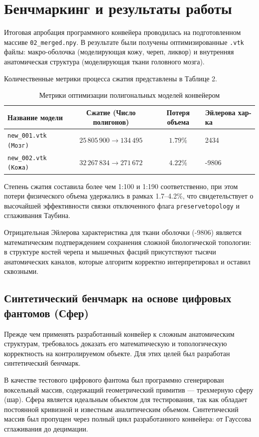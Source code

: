 \documentclass[a4paper,14pt]{article}
\begin{document}
\section{Бенчмаркинг и результаты работы}

Итоговая апробация программного конвейера проводилась на подготовленном массиве \texttt{02\_merged.npy}. В результате были получены оптимизированные \texttt{.vtk} файлы: макро-оболочка (моделирующая кожу, череп, ликвор) и внутренняя анатомическая структура (моделирующая ткани головного мозга).

Количественные метрики процесса сжатия представлены в Таблице 2.
\begin{table}[h]
\centering
\caption{Метрики оптимизации полигональных моделей конвейером}
\begin{tabular}{|l|c|c|l|}
\hline
\textbf{Название модели} & \textbf{Сжатие (Число полигонов)} & \textbf{Потеря объема} & \textbf{Эйлерова хар-ка} \\ \hline
\texttt{new\_001.vtk (Мозг)} & $25\,805\,900 \to 134\,495$ & $1.79\%$ & 2434 \\ \hline
\texttt{new\_002.vtk (Кожа)} & $32\,267\,834 \to 271\,672$ & $4.22\%$ & -9806 \\ \hline
\end{tabular}
\end{table}

Степень сжатия составила более чем 1:100 и 1:190 соответственно, при этом потери физического объема удержались в рамках 1.7--4.2\%, что свидетельствует о высочайшей эффективности связки отключенного флага \texttt{preservetopology} и сглаживания Таубина.

Отрицательная Эйлерова характеристика для ткани оболочки (-9806) является математическим подтверждением сохранения сложной биологической топологии: в структуре костей черепа и мышечных фасций присутствуют тысячи анатомических каналов, которые алгоритм корректно интерпретировал и оставил сквозными.

\subsection{Синтетический бенчмарк на основе цифровых фантомов (Сфер)}
Прежде чем применять разработанный конвейер к сложным анатомическим структурам, требовалось доказать его математическую и топологическую корректность на контролируемом объекте. Для этих целей был разработан синтетический бенчмарк.

В качестве тестового цифрового фантома был программно сгенерирован воксельный массив, содержащий геометрический примитив — трехмерную сферу (шар). Сфера является идеальным объектом для тестирования, так как обладает постоянной кривизной и известным аналитическим объемом. Синтетический массив был пропущен через полный цикл разработанного конвейера: от Гауссова сглаживания до децимации.
\end{document}
